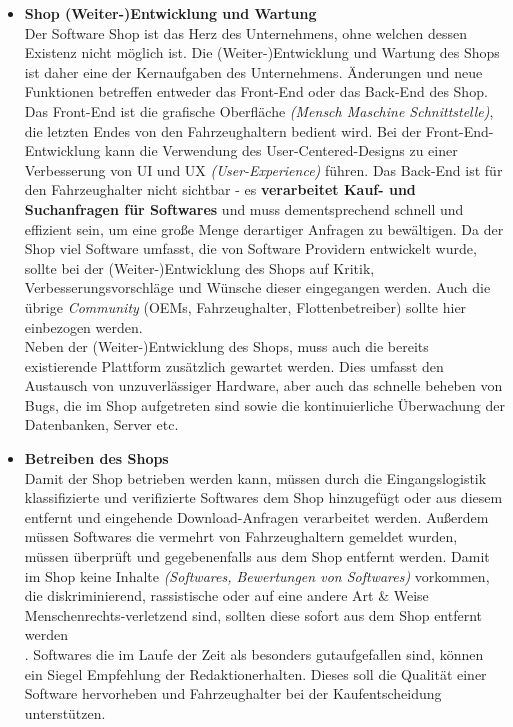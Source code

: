 \begin{itemize}
	\item[] \hspace{-0.6cm} \textbf{Shop (Weiter-)Entwicklung und Wartung}\\
	Der Software Shop ist das Herz des Unternehmens, ohne welchen dessen Existenz nicht möglich ist. Die (Weiter-)Entwicklung und Wartung des Shops ist daher eine der Kernaufgaben des Unternehmens. Änderungen und neue Funktionen betreffen entweder das Front-End oder das Back-End des Shop. Das Front-End ist die grafische Oberfläche \textit{(Mensch Maschine Schnittstelle)}, die letzten Endes von den Fahrzeughaltern bedient wird. Bei der Front-End-Entwicklung kann die Verwendung des User-Centered-Designs zu einer Verbesserung von UI und UX \textit{(User-Experience)} führen. Das Back-End ist für den Fahrzeughalter nicht sichtbar - es \textbf{verarbeitet Kauf- und Suchanfragen für Softwares} und muss dementsprechend schnell und effizient sein, um eine große Menge derartiger Anfragen zu bewältigen. Da der Shop viel Software umfasst, die von Software Providern entwickelt wurde, sollte bei der (Weiter-)Entwicklung des Shops auf Kritik, Verbesserungsvorschläge und Wünsche dieser eingegangen werden. Auch die übrige \textit{Community} (OEMs, Fahrzeughalter, Flottenbetreiber) sollte hier einbezogen werden.\\
	Neben der (Weiter-)Entwicklung des Shops, muss auch die bereits existierende Plattform zusätzlich gewartet werden. Dies umfasst den Austausch von unzuverlässiger Hardware, aber auch das schnelle beheben von Bugs, die im Shop aufgetreten sind sowie die kontinuierliche Überwachung der Datenbanken, Server etc.

	\item[] \hspace{-0.6cm}\textbf{Betreiben des Shops}\\	
	Damit der Shop betrieben werden kann, müssen durch die Eingangslogistik klassifizierte und verifizierte Softwares dem Shop hinzugefügt oder aus diesem entfernt und eingehende Download-Anfragen verarbeitet werden. Außerdem müssen Softwares die vermehrt von Fahrzeughaltern gemeldet wurden, müssen überprüft und gegebenenfalls aus dem Shop entfernt werden. Damit im Shop keine Inhalte \textit{(Softwares, Bewertungen von Softwares)} vorkommen, die diskriminierend, rassistische oder auf eine andere Art \& Weise Menschenrechts-verletzend sind, sollten diese sofort aus dem Shop entfernt werden\\.
	Softwares die im Laufe der Zeit als \glqq besonders gut\grqq aufgefallen sind, können ein Siegel \glqq Empfehlung der Redaktion\grqq erhalten. Dieses soll die Qualität einer Software hervorheben und Fahrzeughalter bei der Kaufentscheidung unterstützen. 
			

\end{itemize}
